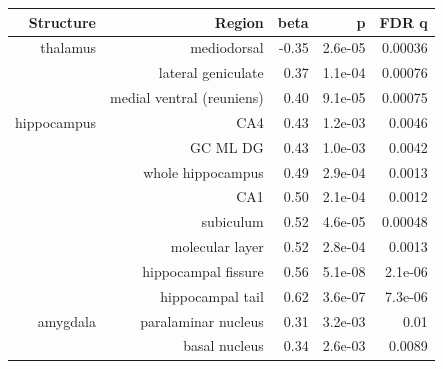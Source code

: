 \documentclass[
]{article}
\begin{document}
\begin{longtable}{rrrrr}
\toprule
Structure & Region & beta & p & FDR q \\ 
\midrule\addlinespace[2.5pt]
thalamus & mediodorsal & -0.35 & 2.6e-05 & 0.00036 \\ 
 & lateral geniculate & 0.37 & 1.1e-04 & 0.00076 \\ 
 & medial ventral (reuniens) & 0.40 & 9.1e-05 & 0.00075 \\ 
hippocampus & CA4 & 0.43 & 1.2e-03 & 0.0046 \\ 
 & GC ML DG & 0.43 & 1.0e-03 & 0.0042 \\ 
 & whole hippocampus & 0.49 & 2.9e-04 & 0.0013 \\ 
 & CA1 & 0.50 & 2.1e-04 & 0.0012 \\ 
 & subiculum & 0.52 & 4.6e-05 & 0.00048 \\ 
 & molecular layer & 0.52 & 2.8e-04 & 0.0013 \\ 
 & hippocampal fissure & 0.56 & 5.1e-08 & 2.1e-06 \\ 
 & hippocampal tail & 0.62 & 3.6e-07 & 7.3e-06 \\ 
amygdala & paralaminar nucleus & 0.31 & 3.2e-03 & 0.01 \\ 
 & basal nucleus & 0.34 & 2.6e-03 & 0.0089 \\ 
\bottomrule
\end{longtable}
\end{document}

